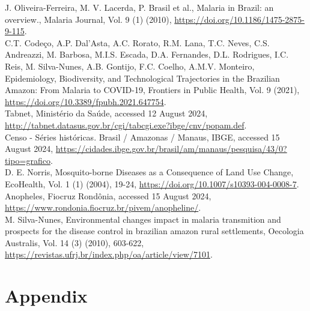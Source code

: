 \documentclass[a4paper,fleqn]{cas-dc}
\begin{document}
\begin{thebibliography}{00}
 J. Oliveira-Ferreira, M. V. Lacerda, P. Brasil et al., Malaria in Brazil: an overview., Malaria Journal, Vol. 9 (1) (2010), \href{https://doi.org/10.1186/1475-2875-9-115}{https://doi.org/10.1186/1475-2875-9-115}.
\\
 C.T. Codeço, A.P. Dal'Asta, A.C. Rorato, R.M. Lana, T.C. Neves, C.S. Andreazzi, M. Barbosa, M.I.S. Escada, D.A. Fernandes, D.L. Rodrigues, I.C. Reis, M. Silva-Nunes, A.B. Gontijo, F.C. Coelho, A.M.V. Monteiro, Epidemiology, Biodiversity, and Technological Trajectories in the Brazilian Amazon: From Malaria to COVID-19, Frontiers in Public Health, Vol. 9 (2021), \href{https://doi.org/10.3389/fpubh.2021.647754}{https://doi.org/10.3389/fpubh.2021.647754}.
\\
 Tabnet, Ministério da Saúde, accessed 12 August 2024, \href{http://tabnet.datasus.gov.br/cgi/tabcgi.exe?ibge/cnv/popam.def}{http://tabnet.datasus.gov.br/cgi/tabcgi.exe?ibge/cnv/popam.def}.
\\
 Censo - Séries históricas. Brasil / Amazonas / Manaus, IBGE, accessed 15 August 2024, \href{https://cidades.ibge.gov.br/brasil/am/manaus/pesquisa/43/0?tipo=grafico}{https://cidades.ibge.gov.br/brasil/am/manaus/pesquisa/43/0?tipo=grafico}.
\\
 D. E. Norris, Mosquito-borne Diseases as a Consequence of Land Use Change, EcoHealth, Vol. 1 (1) (2004), 19-24, \href{https://doi.org/10.1007/s10393-004-0008-7}{https://doi.org/10.1007/s10393-004-0008-7}.
\\
 Anopheles, Fiocruz Rondônia, accessed 15 August 2024, \href{https://www.rondonia.fiocruz.br/pivem/anopheline/}{https://www.rondonia.fiocruz.br/pivem/anopheline/}.
\\
 M. Silva-Nunes, Environmental changes impact in malaria transmition and prospects for the disease control in brazilian amazon rural settlements, Oecologia Australis, Vol. 14 (3) (2010), 603-622, \href{https://revistas.ufrj.br/index.php/oa/article/view/7101}{https://revistas.ufrj.br/index.php/oa/article/view/7101}.
\\
\end{thebibliography}


\appendix
\renewcommand{\thetable}{A.\arabic{table}}
\setcounter{table}{0}  %

\section{Appendix}
\end{document}
